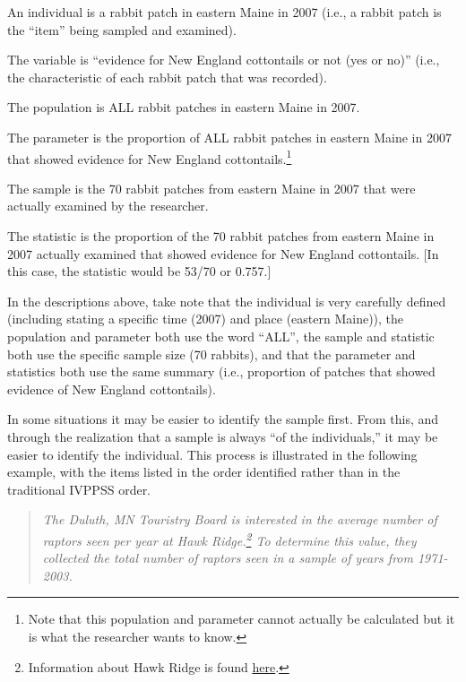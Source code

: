 \documentclass[10pt,openany]{book}\usepackage[]{graphicx}\usepackage[]{color}
\begin{document}
\begin{Itemize}
  \item An individual is a rabbit patch in eastern Maine in 2007 (i.e., a rabbit patch is the ``item'' being sampled and examined).
  \item The variable is ``evidence for New England cottontails or not (yes or no)'' (i.e., the characteristic of each rabbit patch that was recorded).
  \item The population is ALL rabbit patches in eastern Maine in 2007.
  \item The parameter is the proportion of ALL rabbit patches in eastern Maine in 2007 that showed evidence for New England cottontails.\footnote{Note that this population and parameter cannot actually be calculated but it is what the researcher wants to know.}
  \item The sample is the 70 rabbit patches from eastern Maine in 2007 that were actually examined by the researcher.
  \item The statistic is the proportion of the 70 rabbit patches from eastern Maine in 2007 actually examined that showed evidence for New England cottontails. [In this case, the statistic would be 53/70 or 0.757.]
\end{Itemize}

In the descriptions above, take note that the individual is very carefully defined (including stating a specific time (2007) and place (eastern Maine)), the population and parameter both use the word ``ALL'', the sample and statistic both use the specific sample size (70 rabbits), and that the parameter and statistics both use the same summary (i.e., proportion of patches that showed evidence of New England cottontails).

In some situations it may be easier to identify the sample first. From this, and through the realization that a sample is always ``of the individuals,'' it may be easier to identify the individual. This process is illustrated in the following example, with the items listed in the order identified rather than in the traditional IVPPSS order.

\vspace{-6pt}
\begin{quote}
\textit{The Duluth, MN Touristry Board is interested in the average number of raptors seen per year at Hawk Ridge.\footnote{Information about Hawk Ridge is found \href{http://www.hawkridge.org/}{here}.}  To determine this value, they collected the total number of raptors seen in a sample of years from 1971-2003.}
\end{quote}
\vspace{-6pt}
\end{document}
